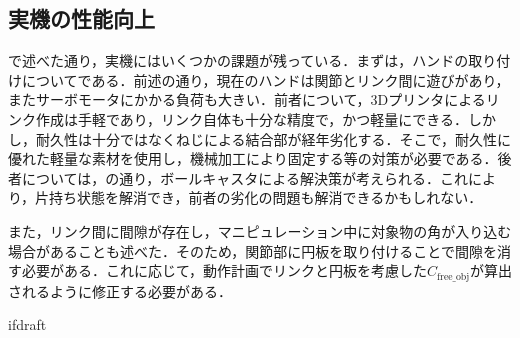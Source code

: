 \documentclass[a4paper,twoside,12pt,papersize, dvipdfmx]{iirthesis}
\begin{document}
\subsection*{実機の性能向上}
で述べた通り，実機にはいくつかの課題が残っている．まずは，ハンドの取り付けについてである．前述の通り，現在のハンドは関節とリンク間に遊びがあり，またサーボモータにかかる負荷も大きい．前者について，3Dプリンタによるリンク作成は手軽であり，リンク自体も十分な精度で，かつ軽量にできる．しかし，耐久性は十分ではなくねじによる結合部が経年劣化する．そこで，耐久性に優れた軽量な素材を使用し，機械加工により固定する等の対策が必要である．後者については，の通り，ボールキャスタによる解決策が考えられる．これにより，片持ち状態を解消でき，前者の劣化の問題も解消できるかもしれない．\par
また，リンク間に間隙が存在し，マニピュレーション中に対象物の角が入り込む場合があることも述べた．そのため，関節部に円板を取り付けることで間隙を消す必要がある．これに応じて，動作計画でリンクと円板を考慮した$C_{\mathrm {free\_obj}}$が算出されるように修正する必要がある．


\expandafter\ifx\csname ifdraft\endcsname\relax
    
\end{document}
